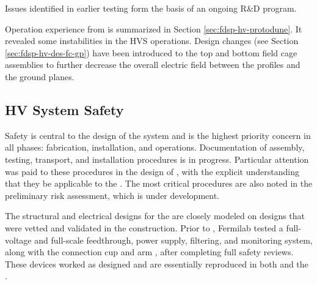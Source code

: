 Issues identified in earlier testing form the basis of an ongoing R\&D program. 


Operation experience from  is summarized in Section \ref{sec:fdsp-hv-protodune}. It revealed some instabilities in the HVS operations.  Design changes (see Section \ref{sec:fdsp-hv-des-fc-gp}) have been introduced to the top and bottom field cage assemblies to further decrease the overall electric field between the profiles and the ground planes.


\subsection{HV System Safety}
\label{fdsp-hv-design-safety}


Safety is central to the design of the  system and is the highest priority concern in all phases: fabrication, installation, and operations. Documentation of assembly, testing, transport, and installation procedures is in progress. Particular attention was paid to these procedures in the design of , with the explicit understanding that they be applicable to the . The most critical procedures are also noted in the preliminary  risk assessment, which is under development. %

The structural and electrical designs for the   are closely modeled on designs that were vetted and validated in the  construction. 
Prior to , Fermilab tested a full-voltage and full-scale  feedthrough, power supply, filtering, and monitoring system, along with the  connection cup and arm  %
, after completing full safety reviews. These devices worked as designed and are essentially reproduced in both  and the . 

